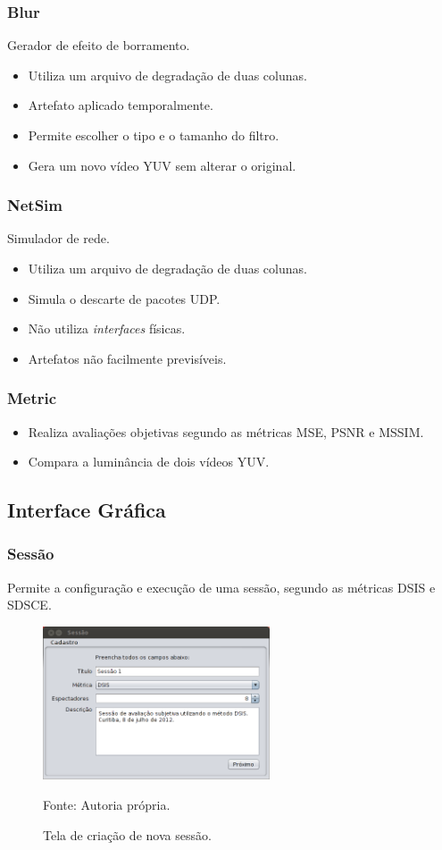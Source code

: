     \begin{frame}\frametitle{Blur}
        Gerador de efeito de borramento.
        \begin{itemize}
            \item Utiliza um arquivo de degradação de duas colunas.
            \item Artefato aplicado temporalmente.
            \item Permite escolher o tipo e o tamanho do filtro.
            \item Gera um novo vídeo YUV sem alterar o original.
        \end{itemize}
    \end{frame}
    
    \begin{frame}\frametitle{NetSim}
        Simulador de rede.
        \begin{itemize}
            \item Utiliza um arquivo de degradação de duas colunas.
            \item Simula o descarte de pacotes UDP.
            \item Não utiliza \emph{interfaces} físicas.
            \item Artefatos não facilmente previsíveis. %
        \end{itemize}
    \end{frame}
    
    \begin{frame}\frametitle{Metric}
        \begin{itemize}
            \item Realiza avaliações objetivas segundo as métricas MSE, PSNR e MSSIM.
            \item Compara a luminância de dois vídeos YUV.
        \end{itemize}
    \end{frame}

\subsection{Interface Gráfica}
        \begin{frame}\frametitle{Sessão}
            Permite a configuração e execução de uma sessão, segundo as métricas DSIS e SDSCE.
		    \begin{figure}
			    \includegraphics[width=0.6\textwidth]{./imgs/sessao1.png}
			    \caption{Tela de criação de nova sessão.}
			    \tiny
			    Fonte: Autoria própria.
		    \end{figure}
        \end{frame}
        
